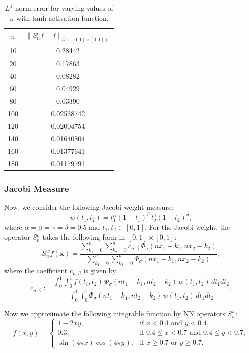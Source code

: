\documentclass[12pt, reqno]{amsart}
\numberwithin{equation}{section}
\theoremstyle{definition}
\theoremstyle{remark}
\numberwithin{equation}{section}
\newcommand{\X}{\mathbf{x}}
\begin{document}
\begin{table}[H]
\centering
\begin{tabular}{|c|c|}
\hline
\textbf{$n$} & \textbf{$\|S^\rho_nf-f\|_{L^1([0,1]\times[0,1])}$} \\
\hline
10  & 0.28442 \\
\hline
20  & 0.17863 \\
\hline
40  & 0.08282 \\
\hline
60  & 0.04929 \\
\hline
80  & 0.03390 \\
\hline
100 & 0.02538742 \\
\hline
120 & 0.02004754 \\
\hline
140 & 0.01640804 \\
\hline
160 & 0.01377641 \\
\hline
180 & 0.01179791 \\
\hline
\end{tabular}
\caption{$L^1$ norm error for varying values of $n$ with tanh activation function.}
\label{intt2}
\end{table}

\subsubsection{Jacobi Measure} 
Now, we consider the following Jacobi weight measure: $$w(t_1,t_2)=t_{1}^{\alpha}(1-t_{1})^{\beta} \, t_{2}^{\gamma}(1-t_{2})^{\delta},$$ where $\alpha=\beta= \gamma= \delta=0.5$ and $t_1, t_2\in [0,1].$ For the Jacobi weight, the operator $S_n^{\rho}$ takes the following form in $[0,1]\times [0,1]$:
\begin{equation}
    S^w_nf(\X)=\displaystyle{\dfrac{\sum_{k_1=0}^n\sum_{k_2=0}^nc_{n,\beta}\,\Phi_\sigma(nx_1-k_1,nx_2-k_2)}{\sum_{k_1=0}^n\sum_{k_2=0}^n\Phi_\sigma(nx_1-k_1,nx_2-k_2)}},\end{equation} where the coefficient $c_{n,\beta}$ is given by 
$$c_{n,\beta}:=\dfrac{\int_0^1\int_0^1f(t_1,t_2)\,\Phi_\sigma(nt_1-k_1,nt_2-k_2)\,w(t_1,t_2)\,dt_1dt_2 
}{\int_0^1\int_0^1\Phi_\sigma(nt_1-k_1,nt_2-k_2)\,w(t_1,t_2)\,dt_1dt_2 }.$$ 

Now we approximate the following integrable function by NN operators $S_n^w$:
$$ f(x, y) =
\begin{cases}
1 - 2xy, & \text{if } x < 0.4 \text{ and } y < 0.4, \\
0.3, & \text{if } 0.4 \leq x < 0.7 \text{ and } 0.4 \leq y < 0.7, \\
\sin(4\pi x) \cos(4\pi y), & \text{if } x \geq 0.7 \text{ or } y \geq 0.7.
\end{cases} $$ 
\end{document}
